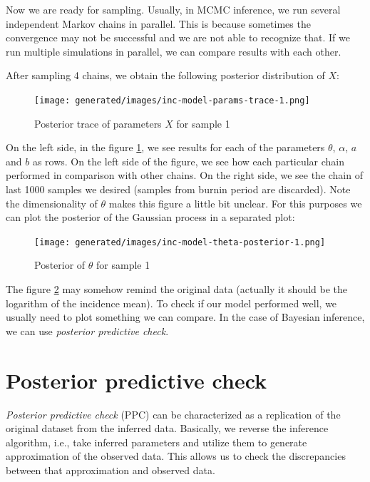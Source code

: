 \documentclass[
  digital, %
  oneside, %
  lof,     %
  lot,     %
]{fithesis4}
\begin{document}
Now we are ready for sampling.
Usually, in MCMC inference, we run several independent
Markov chains in parallel.
This is because sometimes the convergence may not be 
successful and we are not able to recognize that.
If we run multiple simulations in parallel,
we can compare results with each other.

After sampling 4 chains, we obtain the following posterior
distribution of $X$:

\begin{figure}[H]
  \begin{center}
    \texttt{[image: generated/images/inc-model-params-trace-1.png]}
  \end{center}
  \caption{Posterior trace of parameters $X$ for sample 1}
  \label{fig:params-trace-1}
\end{figure}

On the left side, in the figure \ref{fig:params-trace-1},
we see results for each of the parameters 
$\theta$, $\alpha$, $a$ and $b$ as rows.
On the left side of the figure, we see how each 
particular chain performed in comparison with other chains.
On the right side, we see the chain of last 1000 samples 
we desired (samples from burnin period are discarded).
Note the dimensionality of $\theta$ makes this 
figure a little bit unclear.
For this purposes we can plot the posterior of 
the Gaussian process in a separated plot:

\begin{figure}[H]
  \begin{center}
    \texttt{[image: generated/images/inc-model-theta-posterior-1.png]}
  \end{center}
  \caption{Posterior of $\theta$ for sample 1}
  \label{fig:theta-posterior-1}
\end{figure}

The figure \ref{fig:theta-posterior-1} may somehow remind
the original data (actually it should be the logarithm of the incidence mean).
To check if our model performed well, we usually 
need to plot something we can compare. In the case of
Bayesian inference, we can use \textit{posterior predictive check}.


\section{Posterior predictive check}

\textit{Posterior predictive check} (PPC) can be characterized as a replication
of the original dataset from the inferred data. 
Basically, we reverse the inference algorithm,
i.e., take inferred parameters and utilize them to generate
approximation of the observed data.
This allows us to check the discrepancies between that approximation
and observed data.
\end{document}
